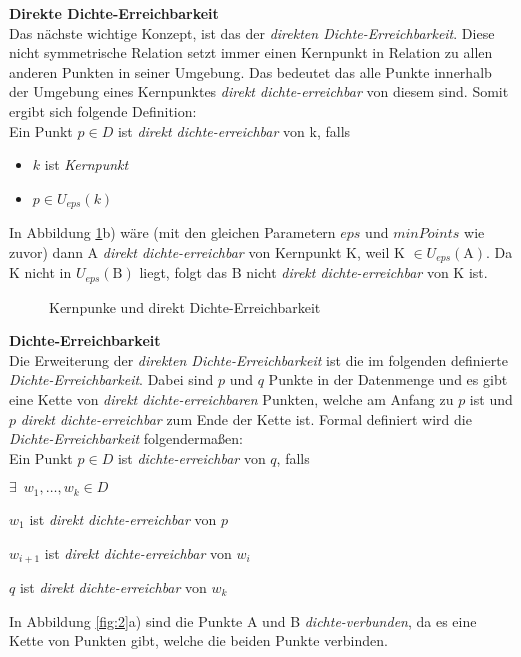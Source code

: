 \documentclass{lni}
\newcommand{\SubItem}[1]{
    {\setlength\itemindent{15pt} \item[-] #1}
}
\begin{document}
\textbf{Direkte Dichte-Erreichbarkeit}\\
Das nächste wichtige Konzept, ist das der \textit{direkten Dichte-Erreichbarkeit}. Diese nicht symmetrische Relation setzt immer einen Kernpunkt in Relation zu allen anderen Punkten in seiner Umgebung. Das bedeutet das alle Punkte innerhalb der Umgebung eines Kernpunktes \textit{direkt dichte-erreichbar} von diesem sind. Somit ergibt sich folgende Definition:\\
Ein Punkt $ p \in D $ ist \textit{direkt dichte-erreichbar} von k, falls
\begin{itemize}
    \item $k$ ist \textit{Kernpunkt}
    \item $ p \in U_{eps}(k) $
\end{itemize}
In Abbildung \ref{fig:1}b) wäre (mit den gleichen Parametern $eps$ und $minPoints$ wie zuvor) dann A \textit{direkt dichte-erreichbar} von Kernpunkt K, weil K $\in U_{eps}(\text{A})$. Da K nicht in $U_{eps}(\text{B})$ liegt, folgt das B nicht \textit{direkt dichte-erreichbar} von K ist.


\begin{figure}[hb]
    \centering
    \subfloat[]{{}}%
    \qquad
    \subfloat[]{{}}
    \caption{Kernpunke und direkt Dichte-Erreichbarkeit}%
    \label{fig:1}%
\end{figure}


\newpage

\textbf{Dichte-Erreichbarkeit}\\
Die Erweiterung der \textit{direkten Dichte-Erreichbarkeit} ist die im folgenden definierte \textit{Dichte-Erreichbarkeit}. Dabei sind $p$ und $q$ Punkte in der Datenmenge und es gibt eine Kette von \textit{direkt dichte-erreichbaren} Punkten, welche am Anfang  zu $p$ ist und $p$ \textit{direkt dichte-erreichbar} zum Ende der Kette ist. Formal definiert wird die \textit{Dichte-Erreichbarkeit} folgendermaßen:\\
Ein Punkt $ p \in D $ ist \textit{dichte-erreichbar} von $q$, falls
\begin{itemize}
    \item $\exists\enspace w_1,\dots,w_k \in D$
        \SubItem{$w_1$ ist \textit{direkt dichte-erreichbar} von $p$}
        \SubItem{$w_{i+1}$ ist \textit{direkt dichte-erreichbar} von $w_i$}
        \SubItem{$q$ ist \textit{direkt dichte-erreichbar} von $w_k$}
\end{itemize}
In Abbildung \ref{fig:2}a) sind die Punkte A und B \textit{dichte-verbunden}, da es eine Kette von  Punkten gibt, welche die beiden Punkte verbinden.\\
\end{document}
